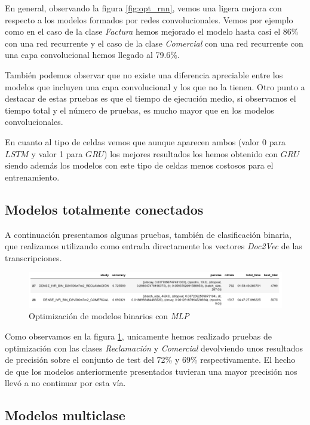 En general, observando la figura \ref{fig:opt_rnn}, vemos una ligera mejora con respecto a los modelos formados por redes convolucionales. Vemos por ejemplo como en el caso de la clase \textit{Factura} hemos mejorado el modelo hasta casi el 86\% con una red recurrente y el caso de la clase \textit{Comercial} con una red recurrente con una capa convolucional hemos llegado al 79.6\%. 

También podemos observar que no existe una diferencia apreciable entre los modelos que incluyen una capa convolucional y los que no la tienen. Otro punto a destacar de estas pruebas es que el tiempo de ejecución medio, si observamos el tiempo total y el número de pruebas, es mucho mayor que en los modelos convolucionales. 

En cuanto al tipo de celdas vemos que aunque aparecen ambos (valor 0 para $LSTM$ y valor 1 para $GRU$) los mejores resultados los hemos obtenido con $GRU$ siendo además los modelos con este tipo de celdas menos costosos para el entrenamiento. 

\subsection{Modelos totalmente conectados}

A continuación presentamos algunas pruebas, también de clasificación binaria, que realizamos utilizando como entrada directamente los vectores \textit{Doc2Vec} de las transcripciones.  

\begin{figure}[!ht]
	\centering
	\includegraphics[width=1\textwidth]{images/super/opt_dense}
	\caption{Optimización de modelos binarios con \textit{MLP}}
	\label{fig:opt_dense}
\end{figure}

Como observamos en la figura \ref{fig:opt_dense}, unicamente hemos realizado pruebas de optimización con las clases \textit{Reclamación} y \textit{Comercial} devolviendo unos resultados de precisión sobre el conjunto de test del 72\% y 69\% respectivamente. El hecho de que los modelos anteriormente presentados tuvieran una mayor precisión nos llevó a no continuar por esta vía. 
 

\subsection{Modelos multiclase}

